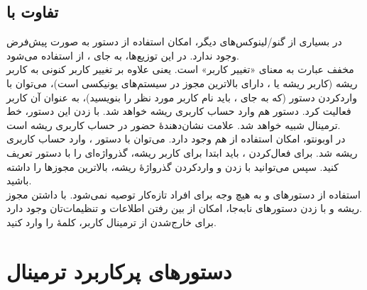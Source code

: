 \subsection[تفاوت sudo با su]{تفاوت  با }
در بسیاری از گنو/لینوکس‌های دیگر، امکان استفاده از دستور  به صورت پیش‌فرض وجود ندارد. در این توزیع‌ها، به جای ، از  استفاده می‌شود.\\
 مخفف عبارت  به معنای «تغییر کاربر» است. یعنی علاوه بر تغییر کاربر کنونی به کاربر ریشه (کاربر ریشه یا ، دارای بالاترین مجوز در سیستم‌های یونیکسی است)، می‌توان با واردکردن دستور  (که به جای ، باید نام کاربر مورد نظر را بنویسید)، به عنوان آن کاربر فعالیت کرد. دستور  هم وارد حساب کاربری ریشه خواهد شد. با زدن این دستور، خط ترمینال شبیه  خواهد شد. علامت \lr{\texttt{\#}} نشان‌دهندهٔ حضور در حساب کاربری ریشه است.\\
در اوبونتو، امکان استفاده از  هم وجود دارد. می‌توان با دستور ، وارد حساب کاربری ریشه شد. برای فعال‌کردن ، باید ابتدا برای کاربر ریشه، گذرواژه‌ای را با دستور  تعریف کنید. سپس می‌توانید با زدن  و واردکردن گذرواژهٔ ریشه، بالاترین مجوزها را داشته باشید.\\
استفاده از دستورهای  و  به هیچ وجه برای افراد تازه‌کار توصیه نمی‌شود. با داشتن مجوز ریشه و با زدن دستورهای نابه‌جا، امکان از بین رفتن اطلاعات و تنظیمات‌تان وجود دارد.\\
برای خارج‌شدن از ترمینال کاربر، کلمهٔ  را وارد کنید.

\section{دستورهای پرکاربرد ترمینال}
